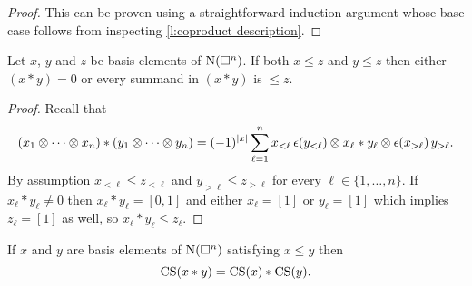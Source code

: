 \begin{proof}
%
%
	This can be proven using a straightforward induction argument whose base case follows from inspecting \cref{l:coproduct description}.
\end{proof}

\begin{lemma}
	Let $x$, $y$ and $z$ be basis elements of $\operatorname{N}(\square^n)$.
	If both $x \leq z$ and $y \leq z$ then either $(x \ast y) = 0$ or every summand in $(x \ast y)$ is $\leq z$.
\end{lemma}

\begin{proof}
	Recall that
	\begin{multline*}
		(x_1 \otimes \cdots \otimes x_n) \ast (y_1 \otimes \cdots \otimes y_n)
		=
		(-1)^{|x|} \sum_{\ell=1}^n x_{<\ell}\, \epsilon(y_{<\ell}) \otimes x_\ell \ast y_\ell \otimes \epsilon(x_{>\ell}) \, y_{>\ell}.
	\end{multline*}
	By assumption $x_{<\ell} \leq z_{<\ell}$ and $y_{>\ell} \leq z_{>\ell}$ for every $\ell \in \{1, \dots, n\}$.
	If $x_\ell \ast y_\ell \neq 0$ then $x_\ell \ast y_\ell = [0,1]$ and either $x_\ell = [1]$ or $y_\ell = [1]$ which implies $z_\ell = [1]$ as well, so $x_\ell \ast y_\ell \leq z_\ell$.
\end{proof}

\begin{lemma}
	If $x$ and $y$ are basis elements of $\operatorname{N}(\square^n)$ satisfying $x \leq y$ then
	\begin{equation} \label{e:cs collapse as algebra map}
		\operatorname{CS}(x \ast y) = \operatorname{CS}(x) \ast \operatorname{CS}(y).
	\end{equation}
\end{lemma}

